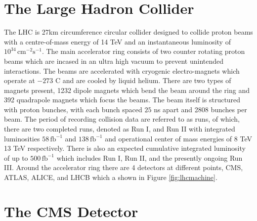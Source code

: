 \section{The Large Hadron Collider}
The LHC is 27km circumference circular collider designed to collide proton beams with a centre-of-mass energy of 14 TeV and an instantaneous luminosity of $10^{34} \, \text{cm}^{-2}\text{s}^{-1}$\cite{Evans:2008zzb}. The main accelerator ring consists of two counter rotating proton beams which are incased in an ultra high vacuum to prevent unintended interactions. The beams are accelerated with cryogenic electro-magnets which operate at $-273$ C and are cooled by liquid helium. There are two types of magnets present, 1232 dipole magnets which bend the beam around the ring and 392 quadrapole magnets which focus the beams.  The beam itself is structured with proton bunches, with each bunch spaced $25$ ns apart and 2808 bunches per beam. The period of recording collision data are referred to as runs, of which, there are two completed runs, denoted as Run I, and Run II with integrated luminosities $58 \, \text{fb}^{-1}$ and $138\, \text{fb}^{-1}$ and operational center of mass energies of 8 TeV 13 TeV respectively. There is also an expected cumulative integrated luminosity of up to $500 \,\text{fb}^{-1}$ which includes Run I, Run II, and the presently ongoing Run III. Around the accelerator ring there are 4 detectors at different points, CMS, ATLAS, ALICE, and LHCB which a shown in Figure \ref{fig:lhcmachine}.




\section{The CMS Detector}

